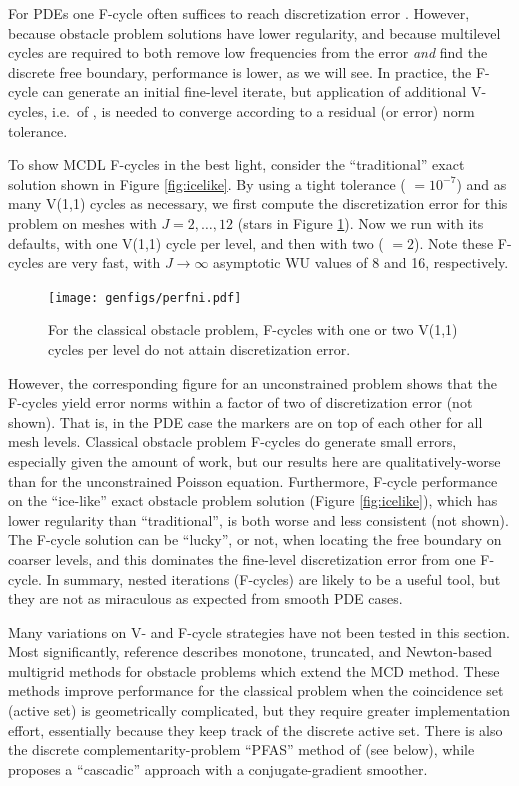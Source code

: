 \documentclass[letterpaper,final,12pt,reqno]{amsart}
\theoremstyle{claim}
\numberwithin{equation}{section}
\numberwithin{figure}{section}
\numberwithin{table}{section}
\numberwithin{theorem}{section}
\begin{document}
For PDEs one F-cycle often suffices to reach discretization error \cite{Trottenbergetal2001}.  However, because obstacle problem solutions have lower regularity, and because multilevel cycles are required to both remove low frequencies from the error \emph{and} find the discrete free boundary, performance is lower, as we will see.  In practice, the F-cycle can generate an initial fine-level iterate, but application of additional V-cycles, i.e.~of , is needed to converge according to a residual (or error) norm tolerance.

To show MCDL F-cycles in the best light, consider the ``traditional'' exact solution shown in Figure \ref{fig:icelike}.  By using a tight tolerance ( $=10^{-7}$) and as many V(1,1) cycles as necessary, we first compute the discretization error for this problem on meshes with $J=2,\dots,12$ (stars in Figure \ref{fig:perfni}).  Now we run  with its defaults, with one V(1,1) cycle per level, and then with two ( $=2$).  Note these F-cycles are very fast, with $J\to\infty$ asymptotic WU values of 8 and 16, respectively.

\begin{figure}
\texttt{[image: genfigs/perfni.pdf]}
\caption{For the classical obstacle problem, F-cycles with one or two V(1,1) cycles per level do not attain discretization error.}
\label{fig:perfni}
\end{figure}

However, the corresponding figure for an unconstrained problem shows that the F-cycles yield error norms within a factor of two of discretization error (not shown).  That is, in the PDE case the markers are on top of each other for all mesh levels.  Classical obstacle problem F-cycles do generate small errors, especially given the amount of work, but our results here are qualitatively-worse than for the unconstrained Poisson equation.  Furthermore, F-cycle performance on the ``ice-like'' exact obstacle problem solution (Figure \ref{fig:icelike}), which has lower regularity than ``traditional'', is both worse and less consistent (not shown).  The F-cycle solution can be ``lucky'', or not, when locating the free boundary on coarser levels, and this dominates the fine-level discretization error from one F-cycle.  In summary, nested iterations (F-cycles) are likely to be a useful tool, but they are not as miraculous as expected from smooth PDE cases.

Many variations on V- and F-cycle strategies have not been tested in this section.  Most significantly, reference \cite{GraeserKornhuber2009} describes monotone, truncated, and Newton-based multigrid methods for obstacle problems which extend the MCD method.  These methods improve performance for the classical problem when the coincidence set (active set) is geometrically complicated, but they require greater implementation effort, essentially because they keep track of the discrete active set.  There is also the discrete complementarity-problem ``PFAS'' method of \cite{BrandtCryer1983} (see below), while \cite{Blumetal2004} proposes a ``cascadic'' approach with a conjugate-gradient smoother.
\end{document}
